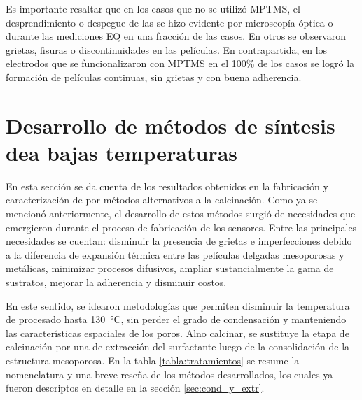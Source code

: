 			 Es importante resaltar que en los casos que no se utilizó MPTMS, el desprendimiento o despegue de las \pdm\space se hizo evidente por microscopía óptica o durante las mediciones EQ en una fracción de las casos. En otros se observaron grietas, fisuras o discontinuidades en las películas. En contrapartida, en los electrodos que se funcionalizaron con MPTMS en el 100\% de los casos se logró la formación de películas continuas, sin grietas y con buena adherencia.

\section{Desarrollo de métodos de síntesis de\hspace{2pt}\pdm\hspace{2pt}a bajas temperaturas}
	
	 	 En esta sección se da cuenta de los resultados obtenidos en la fabricación y caracterización de \pdm\space por métodos alternativos a la calcinación. Como ya se mencionó anteriormente, el desarrollo de estos métodos surgió de necesidades que emergieron durante el proceso de fabricación de los sensores. Entre las principales necesidades se cuentan: disminuir la presencia de grietas e imperfecciones debido a la diferencia de expansión térmica entre las películas delgadas mesoporosas y metálicas, minimizar procesos difusivos, ampliar sustancialmente la gama de sustratos, mejorar la adherencia y disminuir costos.

		 En este sentido, se idearon metodologías que permiten disminuir la temperatura de procesado hasta \SI{130}{\celsius}, sin perder el grado de condensación y manteniendo las características espaciales de los poros. Al\space no calcinar, se sustituye la etapa de calcinación por una de extracción del surfactante luego de la consolidación de la estructura mesoporosa. En la tabla \ref{tabla:tratamientos} se resume la nomenclatura y una breve reseña de los métodos desarrollados, los cuales ya fueron descriptos en detalle en la sección \ref{sec:cond_y_extr}.

